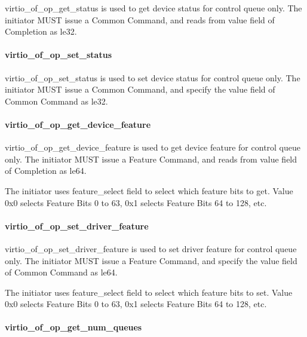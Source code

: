 virtio_of_op_get_status is used to get device status for control queue only. The initiator MUST issue a Common Command, and reads from value field of Completion as le32.

\paragraph{virtio_of_op_set_status}\label{sec:Virtio Transport Options / Virtio Over Fabrics / Transmition Protocol / Opcodes Definition / virtio_of_op_set_status}

virtio_of_op_set_status is used to set device status for control queue only. The initiator MUST issue a Common Command, and specify the value field of Common Command as le32.

\paragraph{virtio_of_op_get_device_feature}\label{sec:Virtio Transport Options / Virtio Over Fabrics / Transmition Protocol / Opcodes Definition / virtio_of_op_get_device_feature}

virtio_of_op_get_device_feature is used to get device feature for control queue only. The initiator MUST issue a Feature Command, and reads from value field of Completion as le64.

The initiator uses feature_select field to select which feature bits to get. Value 0x0 selects Feature Bits 0 to 63, 0x1 selects Feature Bits 64 to 128, etc.

\paragraph{virtio_of_op_set_driver_feature}\label{sec:Virtio Transport Options / Virtio Over Fabrics / Transmition Protocol / Opcodes Definition / virtio_of_op_set_driver_feature}

virtio_of_op_set_driver_feature is used to set driver feature for control queue only. The initiator MUST issue a Feature Command, and specify the value field of Common Command as le64.

The initiator uses feature_select field to select which feature bits to set. Value 0x0 selects Feature Bits 0 to 63, 0x1 selects Feature Bits 64 to 128, etc.

\paragraph{virtio_of_op_get_num_queues}\label{sec:Virtio Transport Options / Virtio Over Fabrics / Transmition Protocol / Opcodes Definition / virtio_of_op_get_num_queues}

